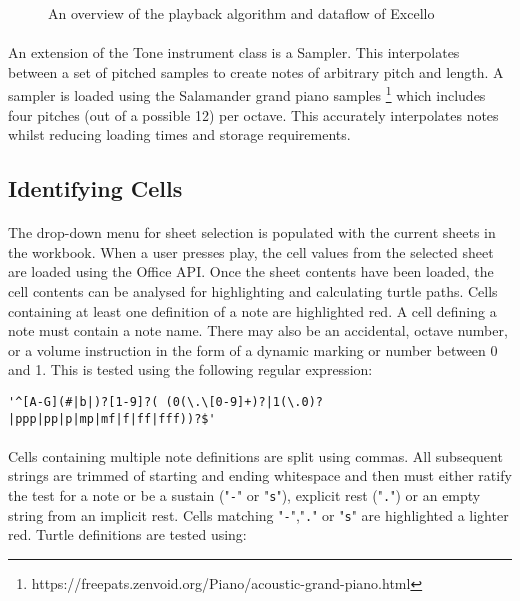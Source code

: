 \begin{figure}[tbh]
\begin{center}

\end{center}
\caption{An overview of the playback algorithm and dataflow of Excello}
\label{fig:overview}
\end{figure}

\paragraph{} An extension of the Tone instrument class is a Sampler. This interpolates between a set of pitched samples to create notes of arbitrary pitch and length. A sampler is loaded using the Salamander grand piano samples \footnote{https://freepats.zenvoid.org/Piano/acoustic-grand-piano.html} which includes four pitches (out of a possible 12) per octave. This accurately interpolates notes whilst reducing loading times and storage requirements.

\subsection{Identifying Cells}

\paragraph{} The drop-down menu for sheet selection is populated with the current sheets in the workbook. When a user presses play, the cell values from the selected sheet are loaded using the Office API. Once the sheet contents have been loaded, the cell contents can be analysed for highlighting and calculating turtle paths. Cells containing at least one definition of a note are highlighted red. A cell defining a note must contain a note name. There may also be an accidental, octave number, or a volume instruction in the form of a dynamic marking or number between 0 and 1. This is tested using the following regular expression:

\begin{verbatim}
'^[A-G](#|b|)?[1-9]?( (0(\.\[0-9]+)?|1(\.0)?|ppp|pp|p|mp|mf|f|ff|fff))?$'
\end{verbatim}

\paragraph{} Cells containing multiple note definitions are split using commas. All subsequent strings are trimmed of starting and ending whitespace and then must either ratify the test for a note or be a sustain ("\texttt{-}" or "\texttt{s}"), explicit rest ("\texttt{.}") or an empty string from an implicit rest. Cells matching "\texttt{-}","\texttt{.}" or "\texttt{s}" are highlighted a lighter red. Turtle definitions are tested using:

